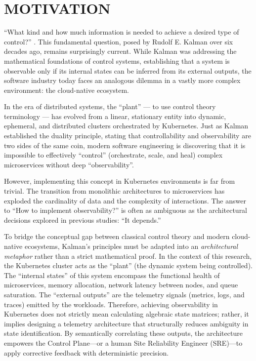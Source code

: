\section{MOTIVATION}
\label{sec:motivation}

``What kind and how much information is needed to achieve a desired type of control?'' \cite{kalman_1959}. This fundamental question, posed by Rudolf E. Kalman over six decades ago, remains surprisingly current. While Kalman was addressing the mathematical foundations of control systems, establishing that a system is observable only if its internal states can be inferred from its external outputs, the software industry today faces an analogous dilemma in a vastly more complex environment: the cloud-native ecosystem.

In the era of distributed systems, the ``plant'' — to use control theory terminology — has evolved from a linear, stationary entity into dynamic, ephemeral, and distributed clusters orchestrated by Kubernetes. Just as Kalman established the duality principle, stating that controllability and observability are two sides of the same coin, modern software engineering is discovering that it is impossible to effectively ``control'' (orchestrate, scale, and heal) complex microservices without deep ``observability''.

However, implementing this concept in Kubernetes environments is far from trivial. The transition from monolithic architectures to microservices has exploded the cardinality of data and the complexity of interactions. The answer to ``How to implement observability?'' is often as ambiguous as the architectural decisions explored in previous studies: ``It depends.''

To bridge the conceptual gap between classical control theory and modern cloud-native ecosystems, Kalman's principles must be adapted into an \textit{architectural metaphor} rather than a strict mathematical proof. In the context of this research, the Kubernetes cluster acts as the ``plant'' (the dynamic system being controlled). The ``internal states'' of this system encompass the functional health of microservices, memory allocation, network latency between nodes, and queue saturation. The ``external outputs'' are the telemetry signals (metrics, logs, and traces) emitted by the workloads. Therefore, achieving observability in Kubernetes does not strictly mean calculating algebraic state matrices; rather, it implies designing a telemetry architecture that structurally reduces ambiguity in state identification. By semantically correlating these outputs, the architecture empowers the Control Plane—or a human Site Reliability Engineer (SRE)—to apply corrective feedback with deterministic precision.

